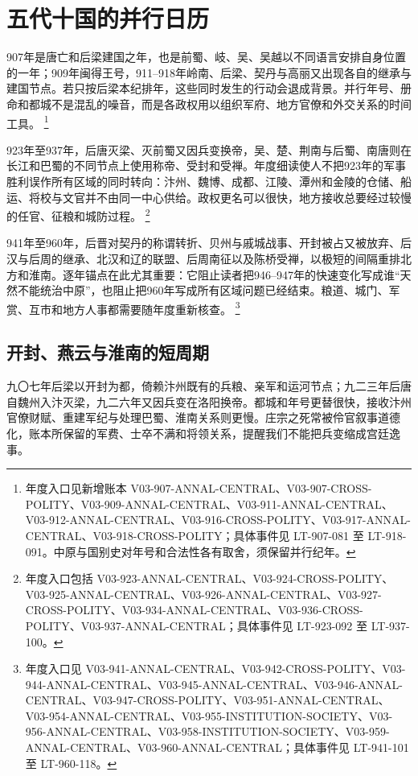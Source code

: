 \section{五代十国的并行日历}
\label{sec:annual-regional-succession}

907年是唐亡和后梁建国之年，也是前蜀、岐、吴、吴越以不同语言安排自身位置的一年；909年闽得王号，911--918年岭南、后梁、契丹与高丽又出现各自的继承与建国节点。若只按后梁本纪排年，这些同时发生的行动会退成背景。并行年号、册命和都城不是混乱的噪音，而是各政权用以组织军府、地方官僚和外交关系的时间工具。%
\footnote{年度入口见新增账本 V03-907-ANNAL-CENTRAL、V03-907-CROSS-POLITY、V03-909-ANNAL-CENTRAL、V03-911-ANNAL-CENTRAL、V03-912-ANNAL-CENTRAL、V03-916-CROSS-POLITY、V03-917-ANNAL-CENTRAL、V03-918-CROSS-POLITY；具体事件见 LT-907-081 至 LT-918-091。中原与国别史对年号和合法性各有取舍，须保留并行纪年。}

923年至937年，后唐灭梁、灭前蜀又因兵变换帝，吴、楚、荆南与后蜀、南唐则在长江和巴蜀的不同节点上使用称帝、受封和受禅。年度细读使人不把923年的军事胜利误作所有区域的同时转向：汴州、魏博、成都、江陵、潭州和金陵的仓储、船运、将校与文官并不由同一中心供给。政权更名可以很快，地方接收总要经过较慢的任官、征粮和城防过程。%
\footnote{年度入口包括 V03-923-ANNAL-CENTRAL、V03-924-CROSS-POLITY、V03-925-ANNAL-CENTRAL、V03-926-ANNAL-CENTRAL、V03-927-CROSS-POLITY、V03-934-ANNAL-CENTRAL、V03-936-CROSS-POLITY、V03-937-ANNAL-CENTRAL；具体事件见 LT-923-092 至 LT-937-100。}

941年至960年，后晋对契丹的称谓转折、贝州与戚城战事、开封被占又被放弃、后汉与后周的继承、北汉和辽的联盟、后周南征以及陈桥受禅，以极短的间隔重排北方和淮南。逐年锚点在此尤其重要：它阻止读者把946--947年的快速变化写成谁“天然不能统治中原”，也阻止把960年写成所有区域问题已经结束。粮道、城门、军赏、互市和地方人事都需要随年度重新核查。%
\footnote{年度入口见 V03-941-ANNAL-CENTRAL、V03-942-CROSS-POLITY、V03-944-ANNAL-CENTRAL、V03-945-ANNAL-CENTRAL、V03-946-ANNAL-CENTRAL、V03-947-CROSS-POLITY、V03-951-ANNAL-CENTRAL、V03-954-ANNAL-CENTRAL、V03-955-INSTITUTION-SOCIETY、V03-956-ANNAL-CENTRAL、V03-958-INSTITUTION-SOCIETY、V03-959-ANNAL-CENTRAL、V03-960-ANNAL-CENTRAL；具体事件见 LT-941-101 至 LT-960-118。}

\subsection{开封、燕云与淮南的短周期}

九〇七年后梁以开封为都，倚赖汴州既有的兵粮、亲军和运河节点；九二三年后唐自魏州入汴灭梁，九二六年又因兵变在洛阳换帝。都城和年号更替很快，接收汴州官僚财赋、重建军纪与处理巴蜀、淮南关系则更慢。庄宗之死常被伶官叙事道德化，账本所保留的军费、士卒不满和将领关系，提醒我们不能把兵变缩成宫廷逸事。

